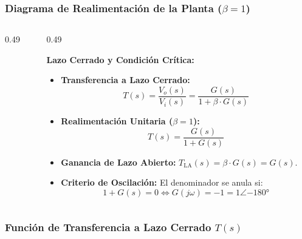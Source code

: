\begin{frame}
  \frametitle{Diagrama de Realimentación de la Planta ($\beta = 1$)}

  \begin{columns}[c, onlytextwidth]
    \begin{column}{0.49\textwidth}
      \begin{tarjeta}[top=14pt, bottom=14pt]
        \centering
      \end{tarjeta}
    \end{column}

    \begin{column}{0.49\textwidth}
      \begin{tarjeta}[top=6pt, bottom=6pt]
        {\fontsize{8.5pt}{10.5pt}\selectfont \textbf{\color{NavyDark} Lazo Cerrado y Condición Crítica:}}\\[1pt]
        {\fontsize{7.2pt}{9pt}\selectfont
        \begin{itemize}\setlength{\itemsep}{1.5pt}
          \item \textbf{Transferencia a Lazo Cerrado:}
          \[ T(s) = \frac{V_o(s)}{V_i(s)} = \frac{G(s)}{1 + \beta \cdot G(s)} \]
          \item \textbf{Realimentación Unitaria ($\beta = 1$):}
          \[ T(s) = \frac{G(s)}{1 + G(s)} \]
          \item \textbf{Ganancia de Lazo Abierto:}
          $T_{\text{LA}}(s) = \beta \cdot G(s) = G(s)$.
          \item \textbf{Criterio de Oscilación:}
          El denominador se anula si:
          \[ 1 + G(s) = 0 \iff G(j\omega) = -1 = 1\angle\ang{-180} \]
        \end{itemize}
        }
      \end{tarjeta}
    \end{column}
  \end{columns}
\end{frame}

\begin{frame}
  \frametitle{Función de Transferencia a Lazo Cerrado $T(s)$}

  \vfill
  \centering
  \begin{tarjeta}[width=0.96\textwidth, top=18pt, bottom=18pt]
    \centering
  \end{tarjeta}
  \vfill
\end{frame}

